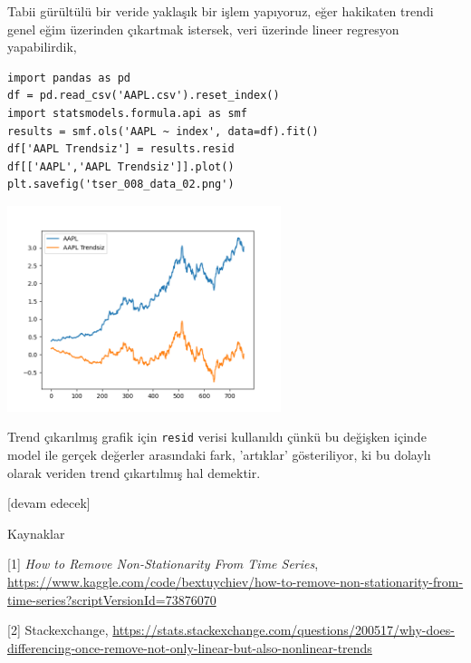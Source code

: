 \documentclass[12pt,fleqn]{article}\usepackage{../../common}
\begin{document}
Tabii gürültülü bir veride yaklaşık bir işlem yapıyoruz, eğer hakikaten trendi
genel eğim üzerinden çıkartmak istersek, veri üzerinde lineer regresyon
yapabilirdik,

\begin{verbatim}
import pandas as pd
df = pd.read_csv('AAPL.csv').reset_index()
import statsmodels.formula.api as smf
results = smf.ols('AAPL ~ index', data=df).fit()
df['AAPL Trendsiz'] = results.resid
df[['AAPL','AAPL Trendsiz']].plot()
plt.savefig('tser_008_data_02.png')
\end{verbatim}

\includegraphics[height=6cm]{tser_008_data_02.png}

Trend çıkarılmış grafik için \verb!resid! verisi kullanıldı çünkü bu değişken
içinde model ile gerçek değerler arasındaki fark, 'artıklar' gösteriliyor, ki bu
dolaylı olarak veriden trend çıkartılmış hal demektir.
















[devam edecek]

Kaynaklar

[1] {\em How to Remove Non-Stationarity From Time Series},
    \url{https://www.kaggle.com/code/bextuychiev/how-to-remove-non-stationarity-from-time-series?scriptVersionId=73876070}

[2] Stackexchange,
    \url{https://stats.stackexchange.com/questions/200517/why-does-differencing-once-remove-not-only-linear-but-also-nonlinear-trends}
    
\end{document}
